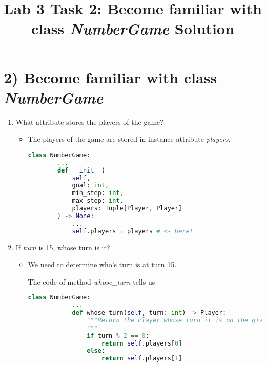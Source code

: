 \documentclass[12pt]{article}
\begin{document}
\title{Lab 3 Task 2: Become familiar with class \textit{NumberGame} Solution}
\date{}
\maketitle

\section*{2) Become familiar with class \textit{NumberGame}}
\begin{enumerate}[1.]
    \item What attribute stores the players of the game?

    \begin{itemize}
    \item The players of the game are stored in instance attribute \textit{players}.

    \begin{lstlisting}[language=Python]
    class NumberGame:
        ...
        def __init__(
            self,
            goal: int,
            min_step: int,
            max_step: int,
            players: Tuple[Player, Player]
        ) -> None:
            ...
            self.players = players # <- Here!
    \end{lstlisting}
    \end{itemize}

    \item If \textit{turn} is 15, whose turn is it?

    \bigskip

    \begin{itemize}
        \item

        We need to determine who's turn is at turn 15.

        \bigskip

        The code of method \textit{whose\_turn} tells us

        \bigskip

        \begin{lstlisting}[language=Python]
        class NumberGame:
            ...
            def whose_turn(self, turn: int) -> Player:
                """Return the Player whose turn it is on the given turn number.
                """
                if turn % 2 == 0:
                    return self.players[0]
                else:
                    return self.players[1]
        \end{lstlisting}


\end{itemize}
\end{enumerate}
\end{document}
